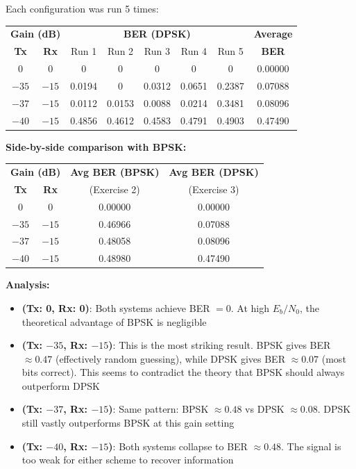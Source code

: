 Each configuration was run 5 times:

\begin{center}
\renewcommand{\arraystretch}{1.5}
\begin{tabular}{cc|ccccc|c}
\hline
\multicolumn{2}{c|}{\textbf{Gain (dB)}} & \multicolumn{5}{c|}{\textbf{BER (DPSK)}} & \textbf{Average} \\
\textbf{Tx} & \textbf{Rx} & Run 1 & Run 2 & Run 3 & Run 4 & Run 5 & \textbf{BER} \\
\hline
0 & 0 & 0 & 0 & 0 & 0 & 0 & 0.00000 \\
$-35$ & $-15$ & 0.0194 & 0 & 0.0312 & 0.0651 & 0.2387 & 0.07088 \\
$-37$ & $-15$ & 0.0112 & 0.0153 & 0.0088 & 0.0214 & 0.3481 & 0.08096 \\
$-40$ & $-15$ & 0.4856 & 0.4612 & 0.4583 & 0.4791 & 0.4903 & 0.47490 \\
\hline
\end{tabular}
\end{center}

\vspace{0.5em}

\textbf{Side-by-side comparison with BPSK:}

\begin{center}
\renewcommand{\arraystretch}{1.4}
\begin{tabular}{cc|c|c}
\hline
\multicolumn{2}{c|}{\textbf{Gain (dB)}} & \textbf{Avg BER (BPSK)} & \textbf{Avg BER (DPSK)} \\
\textbf{Tx} & \textbf{Rx} & (Exercise 2) & (Exercise 3) \\
\hline
0 & 0 & 0.00000 & 0.00000 \\
$-35$ & $-15$ & 0.46966 & 0.07088 \\
$-37$ & $-15$ & 0.48058 & 0.08096 \\
$-40$ & $-15$ & 0.48980 & 0.47490 \\
\hline
\end{tabular}
\end{center}

\textbf{Analysis:}

\begin{itemize}
\item \textbf{(Tx: 0, Rx: 0)}: Both systems achieve BER $= 0$. At high $E_b/N_0$, the theoretical advantage of BPSK is negligible

\item \textbf{(Tx: $-35$, Rx: $-15$)}: This is the most striking result. BPSK gives BER $\approx 0.47$ (effectively random guessing), while DPSK gives BER $\approx 0.07$ (most bits correct). This seems to contradict the theory that BPSK should always outperform DPSK

\item \textbf{(Tx: $-37$, Rx: $-15$)}: Same pattern: BPSK $\approx 0.48$ vs DPSK $\approx 0.08$. DPSK still vastly outperforms BPSK at this gain setting

\item \textbf{(Tx: $-40$, Rx: $-15$)}: Both systems collapse to BER $\approx 0.48$. The signal is too weak for either scheme to recover information
\end{itemize}

